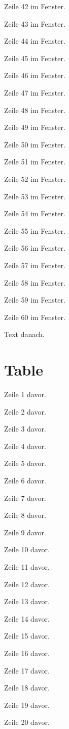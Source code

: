 \begin{Figure}[title=Tall Image Figure]
Zeile 42 im Fenster.

Zeile 43 im Fenster.

Zeile 44 im Fenster.

Zeile 45 im Fenster.

Zeile 46 im Fenster.

Zeile 47 im Fenster.

Zeile 48 im Fenster.

Zeile 49 im Fenster.

Zeile 50 im Fenster.

Zeile 51 im Fenster.

Zeile 52 im Fenster.

Zeile 53 im Fenster.

Zeile 54 im Fenster.

Zeile 55 im Fenster.

Zeile 56 im Fenster.

Zeile 57 im Fenster.

Zeile 58 im Fenster.

Zeile 59 im Fenster.

Zeile 60 im Fenster.

\end{Figure}

Text danach.

\clearpage
\section{Table}
Zeile 1 davor.

Zeile 2 davor.

Zeile 3 davor.

Zeile 4 davor.

Zeile 5 davor.

Zeile 6 davor.

Zeile 7 davor.

Zeile 8 davor.

Zeile 9 davor.

Zeile 10 davor.

Zeile 11 davor.

Zeile 12 davor.

Zeile 13 davor.

Zeile 14 davor.

Zeile 15 davor.

Zeile 16 davor.

Zeile 17 davor.

Zeile 18 davor.

Zeile 19 davor.

Zeile 20 davor.

